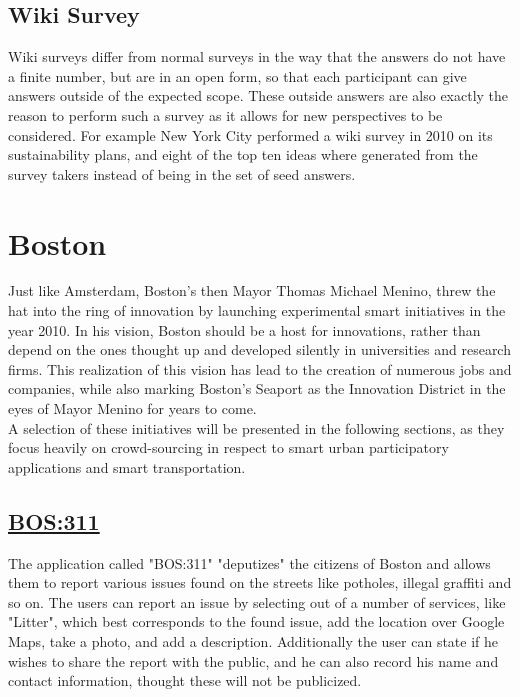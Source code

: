 \documentclass[a4paper,12pt]{report}
\begin{document}
		\subsection[Wiki Survey]{Wiki Survey \cite{BitbyBit}}
		\startsubsection
			Wiki surveys differ from normal surveys in the way that the answers do not have a finite number, but are in an open form, so that each participant can give answers outside of the expected scope. These outside answers are also exactly the reason to perform such a survey as it allows for new perspectives to be considered. For example New York City performed a wiki survey in 2010 on its sustainability plans, and eight of the top ten ideas where generated from the survey takers instead of being in the set of seed answers.
		\closesection
	\closesection
	
	\section[Boston]{Boston \cite{SmartCityBoston}}
	\startsection
		Just like Amsterdam, Boston's then Mayor Thomas Michael Menino, threw the hat into the ring of innovation by launching experimental smart initiatives in the year 2010. In his vision, Boston should be a host for innovations, rather than depend on the ones thought up and developed silently in universities and research firms. This realization of this vision has lead to the creation of numerous jobs and companies, while also marking Boston's Seaport as the Innovation District in the eyes of Mayor Menino for years to come.\\
		A selection of these initiatives will be presented in the following sections, as they focus heavily on crowd-sourcing in respect to smart urban participatory applications and smart transportation.
		\subsection[BOS:311]{\href{https://311.boston.gov/}{BOS:311}}
		\startsubsection
		The application called "BOS:311" "deputizes" the citizens of Boston and allows them to report various issues found on the streets like potholes, illegal graffiti and so on. The users can report an issue by selecting out of a number of services, like "Litter", which best corresponds to the found issue, add the location over Google Maps, take a photo, and add a description. Additionally the user can state if he wishes to share the report with the public, and he can also record his name and contact information, thought these will not be publicized. 
		\closesection		
\end{document}
